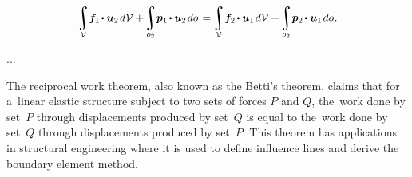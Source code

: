 \nopagebreak\vspace{1.3em}\begin{equation}\label{betti:reciprocalworktheorem}
\tikzmark{beginReciprocalFirstVariant}
\scalebox{.96}{$ \displaystyle %
   \integral\displaylimits_{\mathcal{V}} \hspace{-0.4ex} \bm{f}_1 \hspace{-0.2ex} \dotp \bm{u}_2 \hspace{.25ex} d\mathcal{V} $}
+ \hspace{-0.3ex}
\scalebox{.96}{$ \displaystyle %
   \integral\displaylimits_{o_2} \hspace{-0.4ex} \bm{p}_1 \hspace{-0.2ex} \dotp \bm{u}_2 \hspace{.25ex} do $}
\tikzmark{endReciprocalFirstVariant}
%
\hspace{.2ex} = \hspace{-0.2ex}
%
\tikzmark{beginReciprocalSecondVariant}
\scalebox{.96}{$ \displaystyle %
   \integral\displaylimits_{\mathcal{V}} \hspace{-0.4ex} \bm{f}_2 \hspace{-0.2ex} \dotp \bm{u}_1 \hspace{.25ex} d\mathcal{V} $}
+ \hspace{-0.3ex}
\scalebox{.96}{$ \displaystyle %
   \integral\displaylimits_{o_2} \hspace{-0.4ex} \bm{p}_2 \hspace{-0.2ex} \dotp \bm{u}_1 \hspace{.25ex} do $}
\tikzmark{endReciprocalSecondVariant}
\hspace{.1ex} .
\end{equation}%
%

...

{\small
The reciprocal work theorem, also known as the Betti’s theorem, claims that for a~linear elastic structure subject to two sets of forces $P$ and $Q$, the~work done by set~$P$ through displacements produced by set~$Q$ is equal to the~work done by set~$Q$ through displacements produced by set~$P$.
This theorem has applications in structural engineering where it is used to define influence lines and derive the boundary element method.
\par}

